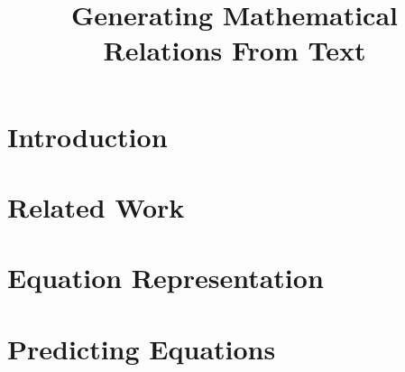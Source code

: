 
\title{Generating Mathematical Relations From Text}


\date{}


\maketitle
\begin{abstract}

\end{abstract}

\section{Introduction}


\section{Related Work}


\section{Equation Representation}


\section{Predicting Equations}




